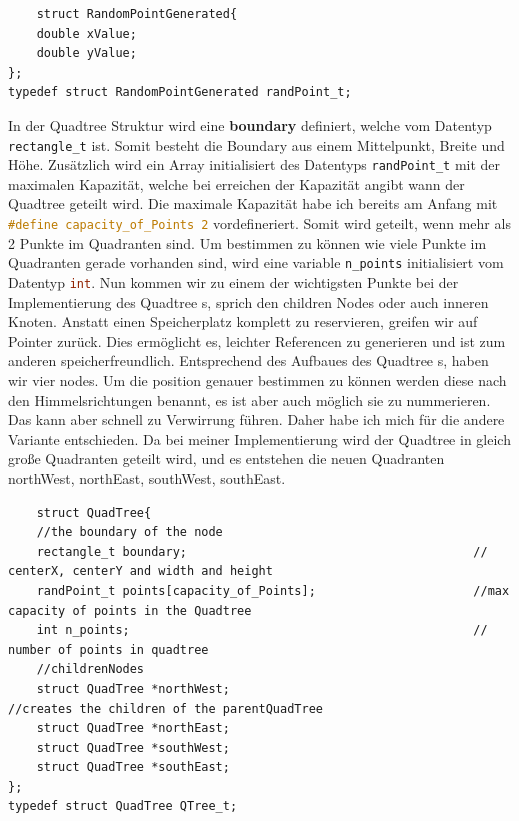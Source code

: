 \documentclass[11pt]{article}
\newcommand{\qt}{Quadtree }
\newcommand{\nw}{northWest}
\newcommand{\noea}{northEast}
\newcommand{\sw}{southWest}
\newcommand{\se}{southEast}
\newcommand{\fett}[1]{{\bf #1}}
\newcommand{\lstin}[1]{\lstinline[language=C]{#1}}
\begin{document}
\begin{lstlisting}
    struct RandomPointGenerated{
    double xValue; 
    double yValue; 
};
typedef struct RandomPointGenerated randPoint_t;
\end{lstlisting}
In der Quadtree Struktur wird eine \fett{boundary} definiert, welche vom Datentyp \lstin{rectangle_t} ist. Somit besteht die Boundary aus einem Mittelpunkt, Breite und Höhe. Zusätzlich wird ein Array initialisiert des Datentyps \lstin{randPoint_t} mit der maximalen Kapazität, welche bei erreichen der Kapazität angibt wann der Quadtree geteilt wird. 
Die maximale Kapazität habe ich bereits am Anfang mit \lstin{#define capacity_of_Points 2} vordefineriert. Somit wird geteilt, wenn mehr als 2 Punkte im Quadranten sind. Um bestimmen zu können wie viele Punkte im Quadranten gerade vorhanden sind, wird eine variable \lstin{n_points} initialisiert vom Datentyp \lstin{int}.
Nun kommen wir zu einem der wichtigsten Punkte bei der Implementierung des \qt s, sprich den children Nodes oder auch inneren Knoten. \newline
Anstatt einen Speicherplatz komplett zu reservieren, greifen wir auf Pointer zurück. Dies ermöglicht es, leichter Referencen zu generieren und ist zum anderen speicherfreundlich. Entsprechend des Aufbaues des \qt s, haben wir vier nodes. Um die position genauer bestimmen zu können werden diese nach den Himmelsrichtungen benannt, es ist aber auch möglich sie zu nummerieren. Das kann aber schnell zu Verwirrung führen. Daher habe ich mich für die andere Variante entschieden.\newline
Da bei meiner Implementierung wird der \qt in gleich große Quadranten geteilt wird, und es entstehen die neuen Quadranten \nw , \noea , \sw , \se. 

\begin{lstlisting}  
    struct QuadTree{
    //the boundary of the node
    rectangle_t boundary;                                        // centerX, centerY and width and height 
    randPoint_t points[capacity_of_Points];                      //max capacity of points in the Quadtree
    int n_points;                                                // number of points in quadtree
    //childrenNodes
    struct QuadTree *northWest;                                 //creates the children of the parentQuadTree 
    struct QuadTree *northEast; 
    struct QuadTree *southWest; 
    struct QuadTree *southEast; 
};
typedef struct QuadTree QTree_t; 
\end{lstlisting}
\end{document}
